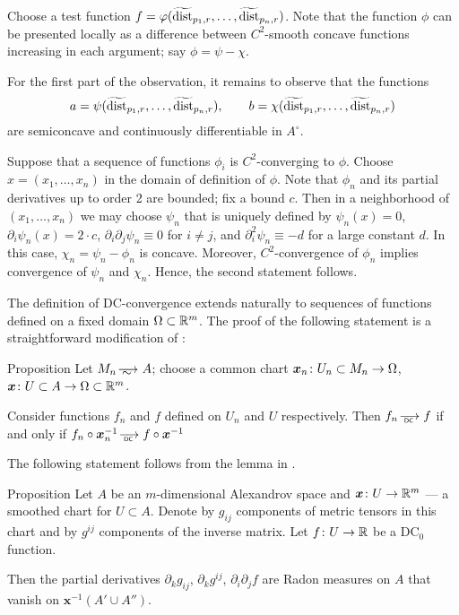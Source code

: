 Choose a test function $f=\varphi(\widetilde{\operatorname{\rm dist}}_{p_1,r},\dots,\widetilde{\operatorname{\rm dist}}_{p_n,r})$.
Note that the function $\phi$ can be presented locally as a difference between $C^2$-smooth concave functions increasing in each argument; say $\phi=\psi-\chi$.

For the first part of the observation, it remains to observe that the functions \[a=\psi(\widetilde\dist_{p_1,r},\zz\dots,\widetilde\dist_{p_n,r}),\qquad b=\chi(\widetilde\dist_{p_1,r},\zz\dots,\widetilde\dist_{p_n,r})\]
are semiconcave and continuously differentiable in $A^\circ$.

Suppose that a sequence of functions $\phi_i$ is $C^2$-converging to $\phi$.
Choose $x=(x_1,\dots,x_n)$ in the domain of definition of $\phi$.
Note that $\phi_n$ and its partial derivatives up to order 2 are bounded;
fix a bound $c$.
Then in a neighborhood of $(x_1,\dots,x_n)$ we may choose $\psi_n$ that is uniquely defined by $\psi_n(x)=0$, $\partial_i\psi_n(x)=2\cdot c$, $\partial_i\partial_j\psi_n\equiv 0$ for $i\ne j$, and $\partial_i^2\psi_n\equiv -d$ for a large constant $d$. 
In this case, $\chi_n=\psi_n-\phi_n$ is concave.
Moreover, $C^2$-convergence of $\phi_n$ implies convergence of $\psi_n$ and $\chi_n$.
Hence, the second statement follows.
\qeds

The definition of DC-convergence extends naturally to sequences of functions defined on a fixed domain $\Omega\subset \mathbb{R}^m$.
The proof of the following statement is a straightforward modification of \cite[Section 3]{PerDC}:

\begin{thm}{Proposition}\label{prop:DC-conv}
Let $M_n\smooths{} A$;
choose a common chart $\bm{x}_n\:U_n\zz\subset M_n\to \Omega$, $\bm{x}\:U\subset A\zz\to \Omega\subset \RR^m$.

Consider functions $f_n$ and $f$ defined on $U_n$ and $U$ respectively.
Then $f_n\DCto f$ if and only if $f_n\circ \bm{x}_n^{-1}\DCto f\circ \bm{x}^{-1}$
\end{thm}

The following statement follows from the lemma in \cite[Section 4]{PerDC}.

\begin{thm}{Proposition}\label{metricBV+}
Let $A$ be an $m$-dimensional Alexandrov space and $\bm{x}\colon U\to \mathbb{R}^m$ --- a smoothed chart for $U\subset A$.
Denote by $g_{ij}$ components of metric tensors in this chart
and by $g^{ij}$ components of the inverse matrix. 
Let $f\colon U\to \mathbb{R}$ be a DC$_0$ function.

Then the partial derivatives $\partial_k g_{ij}$, $\partial_k g^{ij}$, $\partial_i\partial_jf$ are Radon measures on $A$ that vanish on $\bm{x}^{-1}(A'\cup A'')$.
\end{thm}

